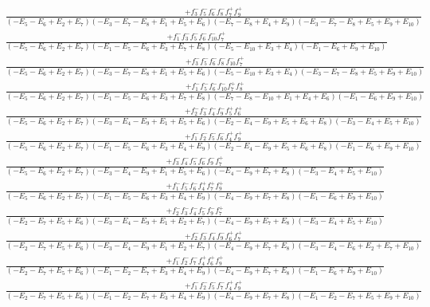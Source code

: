 \documentclass{article}
\begin{document}
\[\begin{array}{rcl}
\frac{+f_{3}^{-}f_{5}^{-}f_{6}^{-}f_{8}^{-}f_{7}^{+}f_{9}^{+}}{(-E_{5}-E_{6}+E_{2}+E_{7})(-E_{3}-E_{7}-E_{8}+E_{1}+E_{5}+E_{6})(-E_{7}-E_{8}+E_{4}+E_{9})(-E_{3}-E_{7}-E_{8}+E_{5}+E_{9}+E_{10})}\\
\frac{+f_{1}^{-}f_{3}^{-}f_{5}^{-}f_{6}^{-}f_{10}^{-}f_{7}^{+}}{(-E_{5}-E_{6}+E_{2}+E_{7})(-E_{1}-E_{5}-E_{6}+E_{3}+E_{7}+E_{8})(-E_{5}-E_{10}+E_{3}+E_{4})(-E_{1}-E_{6}+E_{9}+E_{10})}\\
\frac{+f_{3}^{-}f_{5}^{-}f_{6}^{-}f_{8}^{-}f_{10}^{-}f_{7}^{+}}{(-E_{5}-E_{6}+E_{2}+E_{7})(-E_{3}-E_{7}-E_{8}+E_{1}+E_{5}+E_{6})(-E_{5}-E_{10}+E_{3}+E_{4})(-E_{3}-E_{7}-E_{8}+E_{5}+E_{9}+E_{10})}\\
\frac{+f_{1}^{-}f_{5}^{-}f_{6}^{-}f_{10}^{-}f_{7}^{+}f_{8}^{+}}{(-E_{5}-E_{6}+E_{2}+E_{7})(-E_{1}-E_{5}-E_{6}+E_{3}+E_{7}+E_{8})(-E_{7}-E_{8}-E_{10}+E_{1}+E_{4}+E_{6})(-E_{1}-E_{6}+E_{9}+E_{10})}\\
\frac{+f_{2}^{-}f_{3}^{-}f_{4}^{-}f_{9}^{-}f_{5}^{+}f_{6}^{+}}{(-E_{5}-E_{6}+E_{2}+E_{7})(-E_{3}-E_{4}-E_{9}+E_{1}+E_{5}+E_{6})(-E_{2}-E_{4}-E_{9}+E_{5}+E_{6}+E_{8})(-E_{3}-E_{4}+E_{5}+E_{10})}\\
\frac{+f_{1}^{-}f_{2}^{-}f_{5}^{-}f_{6}^{-}f_{4}^{+}f_{9}^{+}}{(-E_{5}-E_{6}+E_{2}+E_{7})(-E_{1}-E_{5}-E_{6}+E_{3}+E_{4}+E_{9})(-E_{2}-E_{4}-E_{9}+E_{5}+E_{6}+E_{8})(-E_{1}-E_{6}+E_{9}+E_{10})}\\
\frac{+f_{3}^{-}f_{4}^{-}f_{5}^{-}f_{6}^{-}f_{9}^{-}f_{7}^{+}}{(-E_{5}-E_{6}+E_{2}+E_{7})(-E_{3}-E_{4}-E_{9}+E_{1}+E_{5}+E_{6})(-E_{4}-E_{9}+E_{7}+E_{8})(-E_{3}-E_{4}+E_{5}+E_{10})}\\
\frac{+f_{1}^{-}f_{5}^{-}f_{6}^{-}f_{4}^{+}f_{7}^{+}f_{9}^{+}}{(-E_{5}-E_{6}+E_{2}+E_{7})(-E_{1}-E_{5}-E_{6}+E_{3}+E_{4}+E_{9})(-E_{4}-E_{9}+E_{7}+E_{8})(-E_{1}-E_{6}+E_{9}+E_{10})}\\
\frac{+f_{2}^{-}f_{3}^{-}f_{4}^{-}f_{5}^{-}f_{9}^{-}f_{7}^{+}}{(-E_{2}-E_{7}+E_{5}+E_{6})(-E_{3}-E_{4}-E_{9}+E_{1}+E_{2}+E_{7})(-E_{4}-E_{9}+E_{7}+E_{8})(-E_{3}-E_{4}+E_{5}+E_{10})}\\
\frac{+f_{2}^{-}f_{3}^{-}f_{4}^{-}f_{9}^{-}f_{6}^{+}f_{7}^{+}}{(-E_{2}-E_{7}+E_{5}+E_{6})(-E_{3}-E_{4}-E_{9}+E_{1}+E_{2}+E_{7})(-E_{4}-E_{9}+E_{7}+E_{8})(-E_{3}-E_{4}-E_{6}+E_{2}+E_{7}+E_{10})}\\
\frac{+f_{1}^{-}f_{2}^{-}f_{7}^{-}f_{4}^{+}f_{6}^{+}f_{9}^{+}}{(-E_{2}-E_{7}+E_{5}+E_{6})(-E_{1}-E_{2}-E_{7}+E_{3}+E_{4}+E_{9})(-E_{4}-E_{9}+E_{7}+E_{8})(-E_{1}-E_{6}+E_{9}+E_{10})}\\
\frac{+f_{1}^{-}f_{2}^{-}f_{5}^{-}f_{7}^{-}f_{4}^{+}f_{9}^{+}}{(-E_{2}-E_{7}+E_{5}+E_{6})(-E_{1}-E_{2}-E_{7}+E_{3}+E_{4}+E_{9})(-E_{4}-E_{9}+E_{7}+E_{8})(-E_{1}-E_{2}-E_{7}+E_{5}+E_{9}+E_{10})}\\

\end{array}\]
\end{document}
